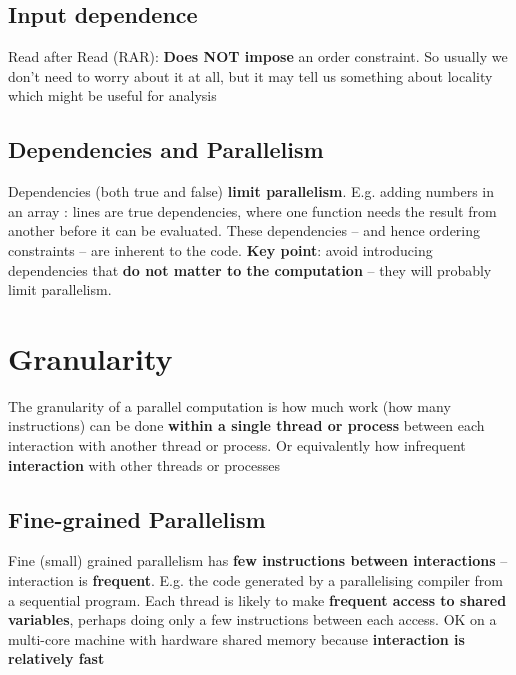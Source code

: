 \documentclass{article}
\begin{document}
\subsection{Input dependence}
\begin{flushleft}
Read after Read (RAR): \textbf{Does NOT impose} an order constraint. So usually we don’t need to worry about it at all, but it may tell us something about locality which might be useful for analysis
\end{flushleft}

\subsection{Dependencies and Parallelism}
\begin{flushleft}
Dependencies (both true and false) \textbf{limit parallelism}. E.g. adding numbers in an array : lines are true dependencies, where one function needs the result from another before it can be evaluated. These dependencies – and hence ordering constraints – are inherent to the code. \textbf{Key point}: avoid introducing dependencies that \textbf{do not matter to the computation} – they will probably limit parallelism.
\end{flushleft}

\section{Granularity}
\begin{flushleft}
The granularity of a parallel computation is how much work (how many instructions) can be done \textbf{within a single thread or process} between each interaction with another thread or process. Or equivalently how infrequent \textbf{interaction} with other threads or processes
\end{flushleft}

\subsection{Fine-grained	Parallelism}
\begin{flushleft}
Fine (small) grained parallelism has \textbf{few instructions between interactions} – interaction is \textbf{frequent}. E.g. the code generated by a parallelising compiler from a sequential program. Each thread is likely to make \textbf{frequent access to shared variables}, perhaps doing only a few instructions between each access. OK on a multi-core machine with hardware shared memory because \textbf{interaction is relatively fast}
\end{flushleft}
\end{document}

